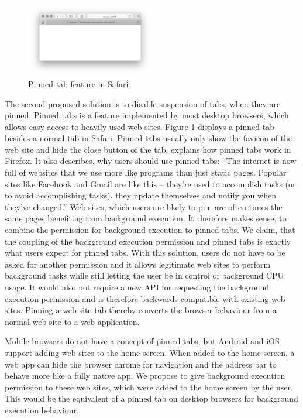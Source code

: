 \documentclass[
	ruledheaders=section,%
	class=report,%
	thesis={type=bachelor},%
	accentcolor=9c,%
	custommargins=true,%
	marginpar=false,%
	parskip=half-,%
	fontsize=11pt,%
]{tudapub}
\begin{document}
  \begin{figure}
    \centering
    \includegraphics[width=0.5\textwidth]{images/pinned-tab.png}
    \caption{Pinned tab feature in Safari}
    \label{fig:pinned-tab}
  \end{figure}
  
  The second proposed solution is to disable suspension of tabs, when they are pinned. Pinned tabs is a feature implemented by most desktop browsers, which allows easy access to heavily used web sites. Figure \ref{fig:pinned-tab} displays a pinned tab besides a normal tab in Safari. Pinned tabs usually only show the favicon of the web site and hide the close button of the tab. \cite{firefox-pinned-tabs} explains how pinned tabs work in Firefox. It also describes, why users should use pinned tabs: ``The internet is now full of websites that we use more like programs than just static pages. Popular sites like Facebook and Gmail are like this – they're used to accomplish tasks (or to avoid accomplishing tasks), they update themselves and notify you when they've changed.'' Web sites, which users are likely to pin, are often times the same pages benefiting from background execution. It therefore makes sense, to combine the permission for background execution to pinned tabs. We claim, that the coupling of the background execution permission and pinned tabs is exactly what users expect for pinned tabs. With this solution, users do not have to be asked for another permission and it allows legitimate web sites to perform background tasks while still letting the user be in control of background CPU usage. It would also not require a new API for requesting the background execution permission and is therefore backwards compatible with existing web sites. Pinning a web site tab thereby converts the browser behaviour from a normal web site to a web application.

  Mobile browsers do not have a concept of pinned tabs, but Android and iOS support adding web sites to the home screen. When added to the home screen, a web app can hide the browser chrome for navigation and the address bar to behave more like a fully native app. We propose to give background execution permission to these web sites, which were added to the home screen by the user. This would be the equivalent of a pinned tab on desktop browsers for background execution behaviour.
  

  
  \newpage
  \printbibliography[heading=bibnumbered]


  \affidavit
\end{document}
